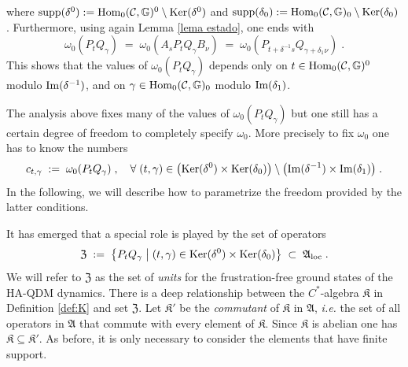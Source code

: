 \documentclass[a4paper,12pt,twoside,reqno]{amsart}
\theoremstyle{plain}
\theoremstyle{definition}
\theoremstyle{remark}
\numberwithin{equation}{section}
\numberwithin{figure}{section}
\numberwithin{table}{section}
\newcommand{\f}[1]{\mathcal{#1}}
\newcommand{\n}[1]{\mathbb{#1}}
\begin{document}
	where ${\rm supp}(\delta^0):={\rm Hom}_0(\f{C},\n{G})^0\setminus{\rm Ker}(\delta^0)$
	and ${\rm supp}(\delta_0):={\rm Hom}_0(\f{C},\n{G})_0\setminus{\rm Ker}(\delta_0)$. 
	Furthermore, using again Lemma \ref{lema estado}, one ends with
	\begin{equation}\label{eq:inv_class}
		\omega_0(P_tQ_\gamma)\;=\;\omega_0(A_sP_tQ_\gamma B_\nu)\;=\;\omega_0(P_{t+\delta^{-1}s}Q_{\gamma+\delta_1 \nu})\;.
	\end{equation}
	This shows that the values of $\omega_0(P_tQ_\gamma)$ depends only on 
	$t\in {\rm Hom}_0(\f{C},\n{G})^0$ modulo ${\rm Im}{(\delta^{-1})}$,
	and on $\gamma\in {\rm Hom}_0(\f{C},\n{G})_0$ modulo ${\rm Im}{(\delta_{1})}$. 
	
	
	
	
	
	
	\medskip
	
	
	
	The analysis above fixes many of the values of  $\omega_0(P_tQ_\gamma)$ but one still has  a certain degree of freedom to completely specify $\omega_0$. More precisely to fix $\omega_0$ one has to know the numbers
	\begin{equation}\label{eq:values}
		c_{t,\gamma}\;:=\;\omega_0(P_tQ_\gamma)\;,\quad \forall\; (t,\gamma)\in\big( {\rm Ker}(\delta^0)\times {\rm Ker}(\delta_0)\big)\setminus \big({\rm Im}{(\delta^{-1})}\times  {\rm Im}{(\delta_{1})}\big)\;.
	\end{equation}
	In the following, we will describe how to parametrize the freedom provided by the latter conditions. 
	
	
	
	
	\medskip
	
	
	
	
	
	
	It has emerged that a special role is played by the set of operators
	\[
	\mathfrak{Z}\;:=\;\left\{P_t Q_\gamma \;\middle|\; (t,\gamma)\in {\rm Ker}(\delta^0)\times {\rm Ker}(\delta_0)\right\}\;\subset\;\mathfrak{A}_{\rm loc}\;.
	\]
	We will refer to $\mathfrak{Z}$ as the set of \emph{units} for the 
	frustration-free ground states of the {HA-QDM dynamics}. 
	There is a deep relationship between the $C^*$-algebra $\mathfrak{K}$ in Definition \ref{def:K} and set
	$\mathfrak{Z}$. Let $\mathfrak{K}'$ be the \emph{commutant} of $\mathfrak{K}$ in $\mathfrak{A}$, \emph{i.e.} the set of all operators in $\mathfrak{A}$ that commute with every element of $\mathfrak{K}$. 
	Since $\mathfrak{K}$ is abelian one has $\mathfrak{K}\subseteq\mathfrak{K}'$. 
	As before, it is only necessary to consider the elements that have finite support.
	
\end{document}
